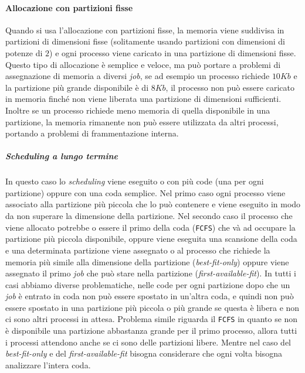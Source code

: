         \paragraph{Allocazione con partizioni fisse}
            Quando si usa l'allocazione con partizioni fisse, la memoria viene suddivisa in partizioni di dimensioni fisse (solitamente usando partizioni con dimensioni di potenze di $2$) e ogni processo viene caricato in una partizione di dimensioni fisse. Questo tipo di allocazione è semplice e veloce, ma può portare a problemi di assegnazione di memoria a diversi \textit{job}, se ad esempio un processo richiede $10Kb$ e la partizione più grande disponibile è di $8Kb$, il processo non può essere caricato in memoria finché non viene liberata una partizione di dimensioni sufficienti. Inoltre se un processo richiede meno memoria di quella disponibile in una partizione, la memoria rimanente non può essere utilizzata da altri processi, portando a problemi di frammentazione interna.
            \subparagraph{\textit{Scheduling} a lungo termine}  
                In questo caso lo \textit{scheduling} viene eseguito o con più code (una per ogni partizione) oppure con una coda semplice. Nel primo caso ogni processo viene associato alla partizione più piccola che lo può contenere e viene eseguito in modo da non superare la dimensione della partizione. Nel secondo caso il processo che viene allocato potrebbe o essere il primo della coda (\texttt{FCFS}) che và ad occupare la partizione più piccola disponibile, oppure viene eseguita una scansione della coda e una determinata partizione viene assegnato o al processo che richiede la memoria più simile alla dimensione della partizione (\textit{best-fit-only}) oppure viene assegnato il primo \textit{job} che può stare nella partizione (\textit{first-available-fit}).\newline
                In tutti i casi abbiamo diverse problematiche, nelle code per ogni partizione dopo che un \textit{job} è entrato in coda non può essere spostato in un'altra coda, e quindi non può essere spostato in una partizione più piccola o più grande se questa è libera e non ci sono altri processi in attesa. Problema simile riguarda il \texttt{FCFS} in quanto se non è disponibile una partizione abbastanza grande per il primo processo, allora tutti i processi attendono anche se ci sono delle partizioni libere. Mentre nel caso del \textit{best-fit-only} e del \textit{first-available-fit} bisogna considerare che ogni volta bisogna analizzare l'intera coda. \newline
